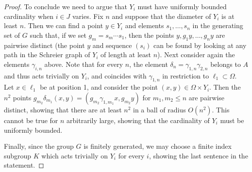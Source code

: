 \documentclass[10pt,a4paper]{amsart}
\begin{document}
\begin{proof}
To conclude we need to argue that  $Y_i$ must have uniformly bounded cardinality when $i\in J$ varies. Fix $n$ and suppose that the diameter of $Y_i$ is at least $n$. Then we can find a point $y\in Y_i$ and elements $s_1, \ldots, s_n$ in the generating set of $G$ such that, if we set $g_m=s_m\cdots s_1$, then the points $y, g_1y,  \ldots, g_ny$ are pairwise distinct (the point $y$ and  sequence $(s_i)$ can be found by looking at any path in the Schreier graph of $Y_i$ of length at least $n$). Next consider again the elements $\gamma_{i, n}$ above. Note that for every $n$, the element $\delta_n=\gamma_{1, n} \gamma_{2, n}$ belongs to $A$ and thus acts trivially on $Y_i$, and coincides with $\gamma_{1, n}$ in restriction to $\ell_1\subset \Omega$. Let $x\in \ell_1$ be at position 1, and consider the point $(x, y)\in \Omega \times Y_i$. Then the $n^2$ points $g_{m_2} \delta_{m_1}(x, y)=(g_{m_2}\gamma_{1,m_1}x, g_{m_2}y)$ for $m_1, m_2\le n$ are pairwise distinct, showing that there are at least $n^2$ in a ball of radius $O(n^2)$. This cannot be true for $n$ arbitrarily large, showing that the cardinality of $Y_i$ must be uniformly bounded. 

Finally, since the group $G$ is finitely generated, we may choose a finite index subgroup $K$ which acts trivially on $Y_i$ for every $i$, showing the last sentence in the statement. \qedhere
\end{proof}
\end{document}
